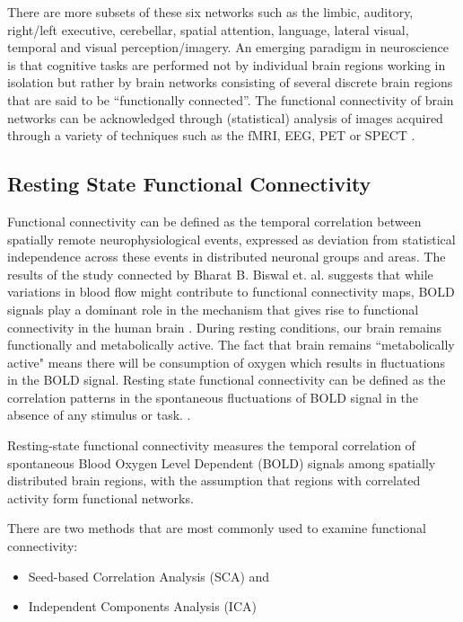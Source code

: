 \documentclass{article}
\begin{document}
There are more subsets of these six networks such as the limbic,
auditory, right/left executive, cerebellar, spatial attention,
language, lateral visual, temporal and visual perception/imagery. An
emerging paradigm in neuroscience is that cognitive tasks are
performed not by individual brain regions working in isolation but
rather by brain networks consisting of several discrete brain regions
that are said to be ``functionally connected''. The functional
connectivity of brain networks can be acknowledged through
(statistical) analysis of images acquired through a variety of
techniques such as the fMRI, EEG, PET or SPECT
\cite{wikibrainnetworks}.
\newpage

\subsection{Resting State Functional Connectivity}

Functional connectivity can be defined as the temporal correlation
between spatially remote neurophysiological events, expressed as
deviation from statistical independence across these events in
distributed neuronal groups and areas. The results of the study
connected by Bharat B. Biswal et. al. suggests that while variations
in blood flow might contribute to functional connectivity maps, BOLD
signals play a dominant role in the mechanism that gives rise to
functional connectivity in the human brain \cite{biswalsimultaneous}.
During resting conditions, our brain remains functionally and
metabolically active. The fact that brain remains ``metabolically
active" means there will be consumption of oxygen which results in
fluctuations in the BOLD signal. Resting state functional connectivity
can be defined as the correlation patterns in the spontaneous
fluctuations of BOLD signal in the absence of any stimulus or task.
\cite{frontiers:rsfc}.

Resting-state functional connectivity measures
the temporal correlation of spontaneous Blood Oxygen Level Dependent
(BOLD) signals among spatially distributed brain regions, with the
assumption that regions with correlated activity form functional
networks.

There are two methods that are most commonly used to examine
functional connectivity:

\begin{itemize}[nosep]
  \item Seed-based Correlation Analysis (SCA) and
  \item Independent Components Analysis (ICA)
\end{itemize}
\end{document}
